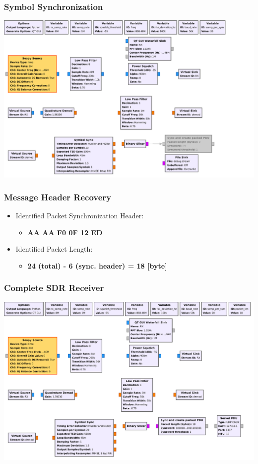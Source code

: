 \documentclass[aspectratio=169]{beamer}
\begin{document}
\begin{frame}
	\frametitle{Symbol Synchronization}

	\begin{center}
		\includegraphics[height=0.9\textheight]{gnuradio-symbol-synchronized-dark.pdf}
	\end{center}
\end{frame}

\begin{frame}
	\frametitle{Message Header Recovery}

	\begin{itemize}
		\item Identified Packet Synchronization Header:
			\begin{itemize}
				\item \textbf{AA AA F0 0F 12 ED}
			\end{itemize}
		\item Identified Packet Length:
			\begin{itemize}
				\item \textbf{24 (total) - 6 (sync. header) = 18 [byte]}
			\end{itemize}
	\end{itemize}
\end{frame}

\begin{frame}
	\frametitle{Complete SDR Receiver}

	\begin{center}
		\includegraphics[height=0.9\textheight]{gnuradio-receiver-dark.pdf}
	\end{center}
\end{frame}
\end{document}
